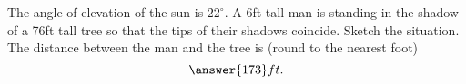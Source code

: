 \documentclass{ximera}
\author{Nela Lakos \and Kyle Parsons}
\begin{document}
\begin{exercise}

The angle of elevation of the sun is $22^{\circ}$.  A 6ft tall man is standing in the shadow of a 76ft tall tree so that the tips of their shadows coincide.  Sketch the situation.  The distance between the man and the tree is (round to the nearest foot)
\[
\answer{173}ft.
\]

\end{exercise}
\end{document}
